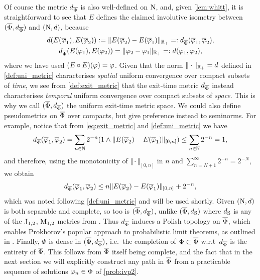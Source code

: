 Of course the metric $d_{\overline{\Phi}}$ is also well-defined on $\mathrm{N}$, and, given \autoref{lem:whitt}, it is straightforward to see that $E$ defines the claimed involutive isometry between $(\overline{\Phi},d_{\overline{\Phi}})$ and $(\mathrm{N},d)$, because
\begin{multline}\label{eq:exit_isometry}
    d(E(\overline{\varphi}_1),E(\overline{\varphi}_2)) := \Vert E(\overline{\varphi}_2) - E(\overline{\varphi}_1) \Vert_{\mathbb{R}_+} =: d_{\overline{\Phi}}(\overline{\varphi}_1,\overline{\varphi}_2),\\
    d_{\overline{\Phi}}(E(\varphi_1),E(\varphi_2)) = \Vert \varphi_2 - \varphi_1 \Vert_{\mathbb{R}_+} =: d(\varphi_1,\varphi_2),
\end{multline}
where we have used $(E\circ E)(\varphi)=\varphi$. Given that the norm $\Vert\cdot\Vert_{\mathbb{R}_+}=d$ defined in \autoref{def:uni_metric} characterises \emph{spatial} uniform convergence over compact subsets of \emph{time}, we see from \autoref{def:exit_metric} that the exit-time metric $d_{\overline{\Phi}}$ instead characterises \emph{temporal} uniform convergence over compact subsets of \emph{space}. This is why we call $(\overline{\Phi},d_{\overline{\Phi}})$ the uniform exit-time metric space. We could also define pseudometrics on $\overline{\Phi}$ over compacts, but give preference instead to seminorms. For example, notice that from \autoref{eq:exit_metric} and \autoref{def:uni_metric} we have
\begin{equation}
    d_{\overline{\Phi}}(\overline{\varphi}_1,\overline{\varphi}_2) = \sum_{n\in\mathbb{N}} 2^{-n}(1\wedge \Vert E(\overline{\varphi}_2) - E(\overline{\varphi}_1) \Vert_{[0,n]})\le \sum_{n\in\mathbb{N}} 2^{-n} = 1,
\end{equation}
and therefore, using the monotonicity of $\Vert \cdot \Vert_{[0,n]}$ in $n$ and $\sum_{n=N+1}^\infty 2^{-n} = 2^{-N}$, we obtain
\begin{equation}\label{eq:metric_bound}
    d_{\overline{\Phi}}(\overline{\varphi}_1,\overline{\varphi}_2) \le n\Vert E(\overline{\varphi}_2) - E(\overline{\varphi}_1) \Vert_{[0,n]} + 2^{-n},
\end{equation}
which was noted following \autoref{def:uni_metric} and will be used shortly. Given $(\mathrm{N},d)$ is both separable and complete, so too is $(\overline{\Phi},d_{\overline{\Phi}})$, unlike $(\overline{\Phi},d_{\mathrm{S}})$ where $d_{\mathrm{S}}$ is any of the $\mathrm{J}_{1,2}$, $\mathrm{M}_{1,2}$ metrics from \cite{skorokhod_1956}. Thus $d_{\overline{\Phi}}$ induces a Polish topology on $\overline{\Phi}$, which enables Prokhorov's popular approach to probabilistic limit theorems, as outlined in \cite{jacod_2003}. Finally, $\Phi$ is dense in $(\overline{\Phi},d_{\overline{\Phi}})$, i.e.~the completion of $\Phi\subset\overline{\Phi}$ w.r.t~$d_{\overline{\Phi}}$ is the entirety of $\overline{\Phi}$. This follows from $\overline{\Phi}$ itself being complete, and the fact that in the next section we will explicitly construct any path in $\overline{\Phi}$ from a practicable sequence of solutions $\varphi_n\in\Phi$ of \autoref{prob:ivp2}.

